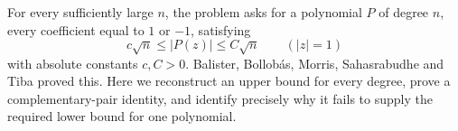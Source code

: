 For every sufficiently large $n$, the problem asks for a polynomial $P$ of degree $n$, every coefficient equal to $1$ or $-1$, satisfying
\[
 c\sqrt n\le |P(z)|\le C\sqrt n\qquad(|z|=1)
\]
with absolute constants $c,C>0$. Balister, Bollob\'as, Morris, Sahasrabudhe and Tiba proved this. Here we reconstruct an upper bound for every degree, prove a complementary-pair identity, and identify precisely why it fails to supply the required lower bound for one polynomial.
